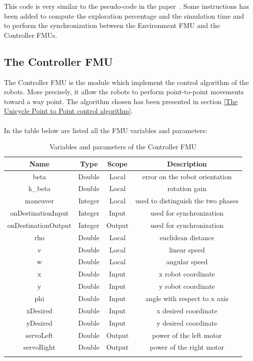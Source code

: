 \documentclass[english]{article}
\begin{document}
\noindent This code is very similar to the pseudo-code in the paper~\cite{AlgorithmPaper}. Some instructions has been added to compute the exploration percentage and the simulation time and to perform the synchronization between the Environment FMU and the Controller FMUs. 
 
\subsection{The Controller FMU}
\label{The Controller FMU}
The Controller FMU is the module which implement the control algorithm of the robots. More precisely, it allow the robots to perform point-to-point movements toward a way point. The algorithm chosen has been presented in section \ref{The Unicycle Point to Point control algorithm}.\\
\\In the table below are listed all the FMU variables and parameters:

\begin{longtable}{|c|c|c|c|}
	\hline
	\textbf{Name} & 
	\textbf{Type} & 
	\textbf{Scope} &
	\textbf{Description} \\ \hline
	\endfirsthead
	\endhead
	beta & Double & Local & error on the robot orientation \\ \hline
	k\_beta & Double & Local & rotation gain \\ \hline
	maneuver & Integer & Local & used to distinguish the two phases \\ \hline
	onDestinationInput & Integer & Input & used for synchronization \\ \hline
	onDestinationOutput & Integer & Output & used for synchronization \\ \hline
	rho & Double & Local & euclidean distance \\ \hline
	v & Double & Local & linear speed \\ \hline
	w & Double & Local & angular speed \\ \hline
	x & Double & Input & x robot coordinate \\ \hline
	y & Double & Input & y robot coordinate \\ \hline
	phi & Double & Input & angle with respect to x axis \\ \hline
	xDesired & Double & Input & x desired coordinate \\ \hline
	yDesired & Double & Input & y desired coordinate \\ \hline 
	servoLeft & Double & Output & power of the left motor \\ \hline
	servoRight & Double & Output & power of the right motor \\ \hline
	\caption{Variables and parameters of the Controller FMU}
	\label{tab:label3}
\end{longtable}  
\end{document}
